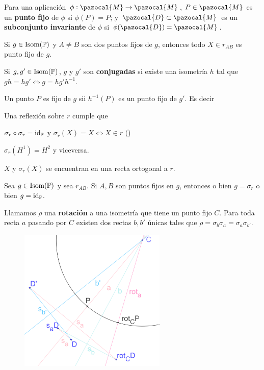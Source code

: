 
 Para una aplicación $\phi: \pazocal{M} \rightarrow \pazocal{M}$, $P\in \pazocal{M}$ es un \textbf{punto fijo} de $\phi$ si $\phi(P) = P$; y $\pazocal{D} \subset \pazocal{M}$ es un \textbf{subconjunto invariante} de $\phi$ si $\phi(\pazocal{D}) = \pazocal{M}$.

 Si $g \in \iso(\P)$ y $A \neq B$ son dos puntos fijos de $g$, entonces todo $X \in r_{AB}$ es punto fijo de $g$.


 Si $g, g' \in \iso(\P)$, $g$ y $g'$ son \textbf{conjugadas}
si existe una isometría $h$ tal que $gh = hg' \iff g = hg'h^{-1}$.

 Un punto $P$ es fijo de $g$ sii $h^{-1}(P)$ es un punto fijo de $g'$. Es decir


 Una reflexión sobre $r$ cumple que
\begin{itemizex}
	\item $\sigma_r\circ\sigma_r = \text{id}_{\P}$ y $\sigma_r(X) = X \iff X \in r$ ()
	\item $\sigma_r(H^1) = H^2$ y viceversa.
	\item $X$ y $\sigma_r(X)$ se encuentran en una recta ortogonal a $r$.
\end{itemizex} 

 Sea $g\in \iso(\P)$ y sea $r_{AB}$. Si $A, B$ son puntos fijos en $g$, entonces o bien $g = \sigma_r$ o bien $g = \text{id}_\P$. 

 Llamamos $\rho$ una \textbf{rotación} a una isometría que tiene un punto fijo $C$. Para toda recta $a$ pasando por $C$ existen dos rectas $b, b'$ únicas tales que $\rho = \sigma_b\sigma_a = \sigma_a\sigma_{b'}$.

\begin{figure}[H]
	\centering
	\includegraphics[width=7cm]{figuras/3-9.png}
	\vspace{-1em}
\end{figure}

